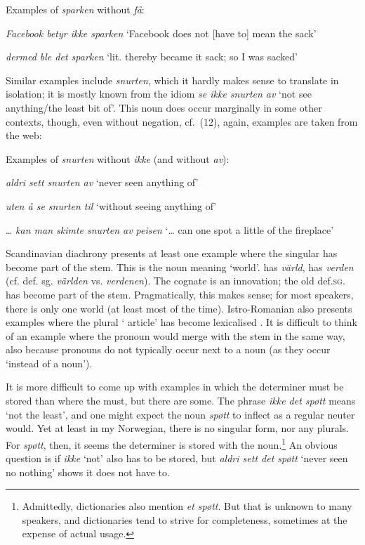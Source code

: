 \documentclass[output=paper]{langsci/langscibook}
\begin{document}
\begin{exe}
\begin{xlist}
\begin{xlist}
\ea\label{ex:Enger:11} Examples of \emph{sparken} without \emph{få}:

\ea \emph{Facebook betyr ikke sparken} `Facebook does not {[}have to{]} mean
the sack'

\ex \emph{dermed ble det sparken} `lit. thereby became it sack; so I was
sacked'

\z
\z

Similar examples include \emph{snurten}, which it hardly makes sense to
translate in isolation; it is mostly known from the idiom \emph{se ikke
snurten av} `not see anything/the least bit of'. This noun does occur
marginally in some other contexts, though, even without negation, cf.~(12), again, examples are taken from the web:

\ea\label{ex:Enger:12} Examples of \emph{snurten} without \emph{ikke} (and without
\emph{av}):

\ea \emph{aldri sett snurten av} `never seen anything of'

\ex \emph{uten å se snurten til} `without seeing anything of'

\ex \ldots{} \emph{kan man skimte snurten av peisen} `\ldots{} can one spot a
little of the fireplace'

\z
\z

Scandinavian diachrony presents at least one example where the 
singular  has become part of the stem. This is the noun meaning
`world'.  has \emph{värld},  has \emph{verden} (cf. def.
sg. \emph{världen} vs. \emph{verdenen}). The  cognate is an
innovation; the old def.\textsc{sg}.  has become part of the stem.
Pragmatically, this makes sense; for most speakers, there is only one
world (at least most of the time). Istro-Romanian also presents examples
where the plural ` article' has become lexicalised %
\citep{Maiden16d}%
%
. It is difficult to think of an example where the pronoun would
merge with the stem in the same way, also because pronouns do not
typically occur next to a noun (as they occur `instead of a noun').

It is more difficult to come up with examples in which the determiner
must be stored than where the  must, but there are some. The
phrase \emph{ikke det spøtt} means `not the least', and one might expect
the noun \emph{spøtt} to inflect as a regular neuter would. Yet at least
in my Norwegian, there is no  singular form, nor any plurals.
For \emph{spøtt}, then, it seems the determiner is stored with the
noun.\footnote{Admittedly, dictionaries also mention \emph{et spøtt}.
  But that is unknown to many speakers, and dictionaries tend to strive
  for completeness, sometimes at the expense of actual usage.} An
obvious question is if \emph{ikke} `not' also has to be stored, but
\emph{aldri sett det spøtt} `never seen no nothing' shows it does not
have to.


\end{xlist}
\end{xlist}
\end{exe}
\end{document}
